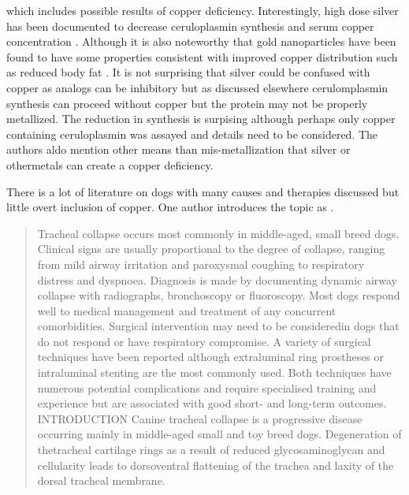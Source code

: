 {which includes  possible results of copper deficiency. Interestingly,
high dose silver has been documented to 
decrease ceruloplasmin synthesis and serum copper
concentration 
\cite{Natelson_Baker_Pyatt_Anemia_leukopenia_following_2019}
\cite{Stepien_Taylor_Colloidal_silver_ingestion_with_2012}.
Although it is also noteworthy that gold nanoparticles
have been found to have some properties consistent
with improved copper distribution such as reduced body fat
\cite{Selima_Saleem_Shawki_Effect_gold_nanoparticles_2025}.
It is not surprising that silver could be confused with copper
as analogs can be inhibitory but as discussed elsewhere
cerulomplasmin synthesis can proceed without copper
but the protein may not be properly metallized. The reduction
in synthesis is surpising although perhaps only copper containing
ceruloplasmin was assayed and details need to be considered.
The authors aldo mention other means 
than mis-metallization that silver or othermetals can create
a copper deficiency.


There is a lot of literature on dogs with many causes and
therapies discussed but little overt inclusion of copper.
One author introduces the topic as 
\cite{Tappin_Canine_tracheal_collapse_2016}.
\begin{quote}
Tracheal collapse occurs most commonly in middle-aged,
small breed dogs. Clinical signs are usually proportional to the degree of
collapse, ranging from mild airway irritation and paroxysmal coughing to
respiratory distress and dyspnoea. Diagnosis is made by documenting dynamic
airway collapse with radiographs, bronchoscopy or fluoroscopy. Most dogs
respond well to medical management and treatment of any concurrent comorbidities.
Surgical intervention may need to be consideredin dogs that do not respond
or have respiratory compromise. A variety of surgical techniques have been
reported although extraluminal ring prostheses or intraluminal stenting
are the most commonly used. Both techniques have numerous potential complications
and require specialised training and experience but are associated with good
short- and long-term outcomes.
INTRODUCTION
Canine tracheal collapse is a
progressive disease occurring mainly in middle-aged small and toy breed dogs.
Degeneration of thetracheal cartilage rings as a result of reduced glycosaminoglycan and
cellularity leads to dorsoventral flattening of the trachea and laxity of
the dorsal tracheal membrane. 
\end{quote}


}
